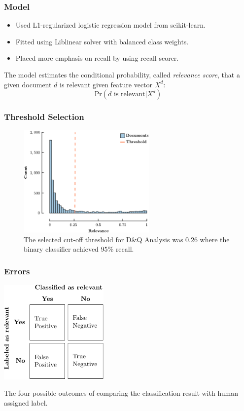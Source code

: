 \documentclass[10pt, xcolor={dvipsnames}]{beamer}
\begin{document}
\begin{frame}
\frametitle{Model}
\begin{itemize}
\item Used L1-regularized logistic regression model from scikit-learn.
\item Fitted using Liblinear solver with balanced class weights. 
\item Placed more emphasis on recall by using recall scorer.
\end{itemize} 

\begin{definition}[Relevance]
The model estimates the conditional probability, called {\it relevance score}, that a given document $d$ is relevant given feature vector $X^{d}$:
$$
\text{Pr}(\text{$d$ is relevant} | X^{d})
$$
\end{definition}
\end{frame}

\begin{frame}
\frametitle{Threshold Selection}

\begin{figure}
\centering
\includegraphics[width=0.6\textwidth]{../report/figures/threshold-selection/threshold-selection-crop.pdf}
\caption{The selected cut-off threshold for D\&Q Analysis was 0.26 where the binary classifier achieved 95\% recall.}
\end{figure}
\end{frame}

\begin{frame}
\frametitle{Errors}
\begin{table}
\centering
\includegraphics[width=0.4\textwidth]{../report/tables/confusion-matrix/confusion-matrix-crop.pdf}
\caption{The four possible outcomes of comparing the classification result with human assigned label.}
\end{table}
\end{frame}
\end{document}

